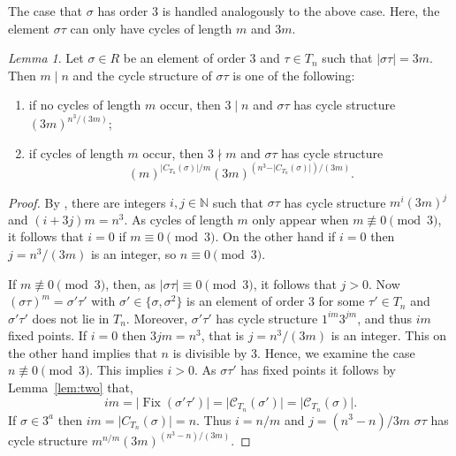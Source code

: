 \documentclass[12pt]{article}
\theoremstyle{definition}
\theoremstyle{remark}
\newtheorem{lemma}[theorem]{Lemma}
\newcommand{\N}{{\mathbb{N}}}
\DeclareMathOperator{\Fix}{Fix}
\newcommand{\C}{{\mathcal{C}}}
\begin{document}
The case that $\sigma$ has order $3$ is handled analogously to the above case. Here, the element $\sigma\tau$ can only have cycles of length $m$ and $3m$.

\bigskip
\begin{lemma}\label{lem:cyclestructthree}
Let $\sigma\in R$ be an element of order $3$ and $\tau \in T_n$ such that $\vert \sigma\tau\vert =3m.$
Then $m\mid n$ and the cycle structure of $\sigma\tau$ is one of the following:
\begin{enumerate}
\item[(a)] if no cycles of length $m$ occur, then $3\mid n$ and
$\sigma\tau $ has cycle structure $(3m)^{n^3/(3m)}$;
\item[(b)] if cycles of length $m$ occur, then $3\nmid m$ and $\sigma\tau$ has cycle structure $$(m)^{\vert C_{T_n}(\sigma)\vert/m}(3m)^{(n^3-\vert C_{T_n}(\sigma)\vert )/(3m)}.$$
\end{enumerate}
\end{lemma}

\begin{proof}

By , there are integers $i,j\in \N$ such that $\sigma\tau$
has cycle structure $m^{i}(3m)^j$ and $(i+3j)m = n^3.$
As cycles of length $m$ only appear when $m\not\equiv 0 \pmod{3}$, it follows that $i=0$ if $m\equiv 0\pmod{3}$. On the other hand if $i=0$ then $j=n^3/(3m)$ is an integer, so $n\equiv 0\pmod{3}.$


If $m\not\equiv 0\pmod{3}$, then,
as $\vert \sigma\tau\vert \equiv 0\pmod{3}$,
it follows that $j>0.$
Now $(\sigma\tau)^m = \sigma'\tau'$  with $\sigma'\in \{\sigma, \sigma^2\}$ is an element of order $3$
 for some $\tau'\in T_n$
 and $\sigma'\tau'$ does not lie in $T_n.$
Moreover, $\sigma'\tau'$ has cycle structure $1^{im}3^{jm}$, and thus $im$ fixed points.
If $i = 0$ then $3jm=n^3$, that is $j = n^3/(3m)$ is an integer. This on the other hand implies that $n$ is divisible by $3$. Hence, we examine the case $n \not\equiv 0 \pmod 3$. This implies $i > 0.$
As $\sigma\tau'$ has fixed points it follows by Lemma~\ref{lem:two} that,
 \[im=\vert \Fix(\sigma'\tau')\vert = |\C_{T_n}(\sigma')\vert =\vert \C_{T_n}(\sigma)\vert .\]
 If $\sigma\in 3^a$ then
 $im = |C_{T_n}(\sigma)\vert =n$. Thus
 $i =n/m$ and $j= (n^3-n)/3m $
$\sigma\tau$ has cycle structure $m^{n/m}(3m)^{(n^3-n)/(3m)}.$


\end{proof}
\end{document}
